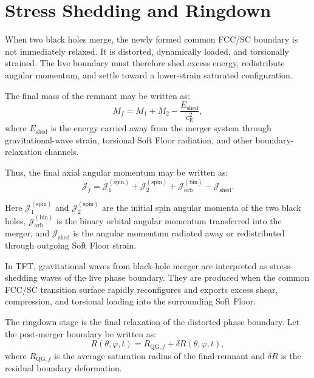 \section{Stress Shedding and Ringdown}

When two black holes merge, the newly formed common FCC/SC boundary is not immediately relaxed. It is distorted, dynamically loaded, and torsionally strained. The live boundary must therefore shed excess energy, redistribute angular momentum, and settle toward a lower-strain saturated configuration.

The final mass of the remnant may be written as:
\begin{equation}
    M_f = M_1 + M_2 - \frac{E_{\mathrm{shed}}}{c_{\mathrm{E}}^2},
\end{equation}
where $E_{\mathrm{shed}}$ is the energy carried away from the merger system through gravitational-wave strain, torsional Soft Floor radiation, and other boundary-relaxation channels.

Thus, the final axial angular momentum may be written as:
\begin{equation}
    \mathcal{J}_f = \mathcal{J}_1^{(\mathrm{spin})} + \mathcal{J}_2^{(\mathrm{spin})} + \mathcal{J}_{\mathrm{orb}}^{(\mathrm{bin})} - \mathcal{J}_{\mathrm{shed}}.
\end{equation}

Here $\mathcal{J}_1^{(\mathrm{spin})}$ and $\mathcal{J}_2^{(\mathrm{spin})}$ are the initial spin angular momenta of the two black holes, $\mathcal{J}_{\mathrm{orb}}^{(\mathrm{bin})}$ is the binary orbital angular momentum transferred into the merger, and $\mathcal{J}_{\mathrm{shed}}$ is the angular momentum radiated away or redistributed through outgoing Soft Floor strain.

In TFT, gravitational waves from black-hole merger are interpreted as stress-shedding waves of the live phase boundary. They are produced when the common FCC/SC transition surface rapidly reconfigures and exports excess shear, compression, and torsional loading into the surrounding Soft Floor.

The ringdown stage is the final relaxation of the distorted phase boundary. Let the post-merger boundary be written as:
\begin{equation}
    R(\theta,\varphi,t) = R_{\mathrm{QG},f} + \delta R(\theta,\varphi,t),
\end{equation}
where $R_{\mathrm{QG},f}$ is the average saturation radius of the final remnant and $\delta R$ is the residual boundary deformation.

